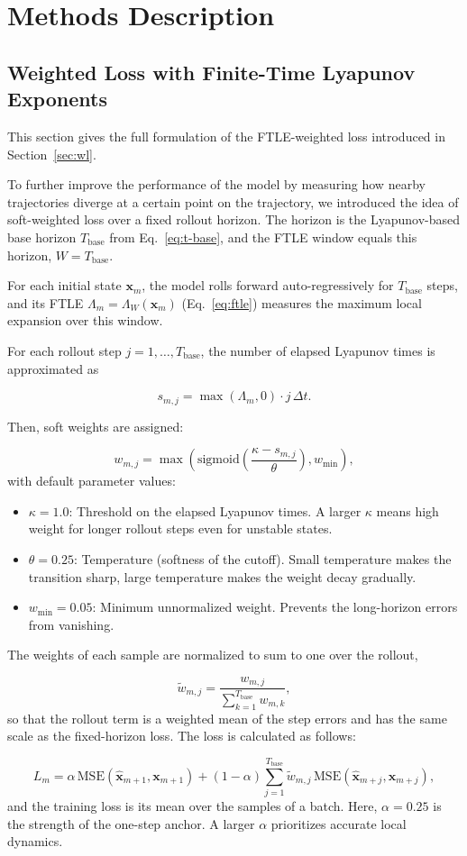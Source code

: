 \documentclass{article}
\begin{document}
\section{Methods Description}
\label{app:method-description}

\subsection{Weighted Loss with Finite-Time Lyapunov Exponents}
\label{app:weighted-loss}

This section gives the full formulation of the FTLE-weighted loss introduced in Section~\ref{sec:wl}.

To further improve the performance of the model by measuring how nearby trajectories diverge at a certain point on the trajectory, we introduced the idea of soft-weighted loss over a fixed rollout horizon. The horizon is the Lyapunov-based base horizon $T_{\mathrm{base}}$ from Eq.~\eqref{eq:t-base}, and the FTLE window equals this horizon, $W = T_{\mathrm{base}}$.

For each initial state $\mathbf{x}_m$, the model rolls forward auto-regressively for $T_{\mathrm{base}}$ steps, and its FTLE $\Lambda_m = \Lambda_W(\mathbf{x}_m)$ (Eq.~\eqref{eq:ftle}) measures the maximum local expansion over this window.

For each rollout step $j = 1, \dots, T_{\mathrm{base}}$, the number of elapsed Lyapunov times is approximated as

\[
s_{m, j} = \max(\Lambda_m, 0) \cdot j \, \Delta t.
\]

Then, soft weights are assigned:

\[
w_{m, j} = \max \left( \mathrm{sigmoid} \left( \frac{\kappa - s_{m, j}}{\theta} \right), w_{\min} \right),
\]
with default parameter values:
\begin{itemize}
    \item $\kappa = 1.0$: Threshold on the elapsed Lyapunov times. A larger $\kappa$ means high weight for longer rollout steps even for unstable states.
    \item $\theta = 0.25$: Temperature (softness of the cutoff). Small temperature makes the transition sharp, large temperature makes the weight decay gradually.
    \item $w_{\min} = 0.05$: Minimum unnormalized weight. Prevents the long-horizon errors from vanishing.
\end{itemize}

The weights of each sample are normalized to sum to one over the rollout,

\[
\tilde{w}_{m, j} = \frac{w_{m, j}}{\sum_{k = 1}^{T_{\mathrm{base}}} w_{m, k}},
\]
so that the rollout term is a weighted mean of the step errors and has the same scale as the fixed-horizon loss. The loss is calculated as follows:

\[
L_m = \alpha \, \mathrm{MSE}(\hat{\mathbf{x}}_{m+1}, \mathbf{x}_{m+1}) + (1 - \alpha) \sum_{j = 1}^{T_{\mathrm{base}}} \tilde{w}_{m, j} \, \mathrm{MSE}(\hat{\mathbf{x}}_{m+j}, \mathbf{x}_{m+j}),
\]
and the training loss is its mean over the samples of a batch. Here, $\alpha = 0.25$ is the strength of the one-step anchor. A larger $\alpha$ prioritizes accurate local dynamics.
\end{document}
